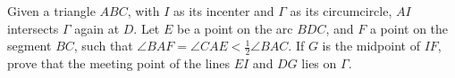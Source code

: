 Given a triangle $ABC$,  with $I$ as its incenter and $\Gamma$ as its circumcircle, $AI$ intersects $\Gamma$ again at $D$. Let $E$ be a point on the arc $BDC$,  and $F$ a point on the segment $BC$,  such that $\angle BAF=\angle CAE < \frac{1}{2} \angle BAC$. If $G$ is the midpoint of $IF$,  prove that the meeting point of the lines $EI$ and $DG$ lies on $\Gamma$.
